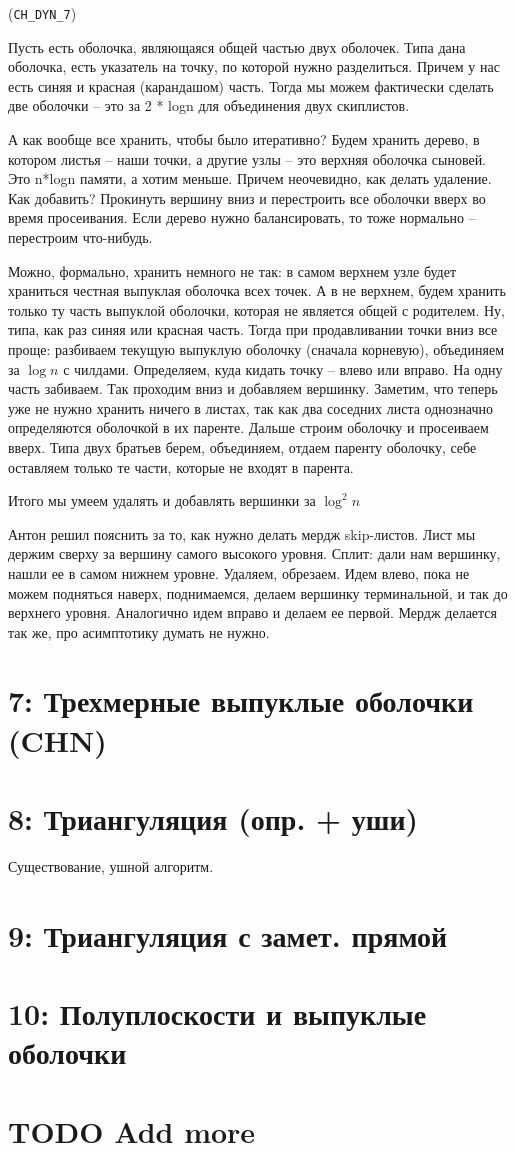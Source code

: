 \documentclass[11pt]{article}
\begin{document}
(\verb~CH_DYN_7~)

Пусть есть оболочка, являющаяся общей частью двух оболочек. Типа
дана оболочка, есть указатель на точку, по которой нужно
разделиться. Причем у нас есть синяя и красная (карандашом) часть.
Тогда мы можем фактически сделать две оболочки -- это за 2 * logn
для объединения двух скиплистов.

А как вообще все хранить, чтобы было итеративно? Будем хранить
дерево, в котором листья -- наши точки, а другие узлы -- это верхняя
оболочка сыновей. Это n*logn памяти, а хотим меньше. Причем
неочевидно, как делать удаление. Как добавить? Прокинуть вершину
вниз и перестроить все оболочки вверх во время просеивания. Если
дерево нужно балансировать, то тоже нормально -- перестроим
что-нибудь.

Можно, формально, хранить немного не так: в самом верхнем узле будет
храниться честная выпуклая оболочка всех точек. А в не верхнем,
будем хранить только ту часть выпуклой оболочки, которая не является
общей с родителем. Ну, типа, как раз синяя или красная часть. Тогда
при продавливании точки вниз все проще: разбиваем текущую выпуклую
оболочку (сначала корневую), объединяем за $\log{n}$ с
чилдами. Определяем, куда кидать точку -- влево или вправо. На одну
часть забиваем. Так проходим вниз и добавляем вершинку. Заметим, что
теперь уже не нужно хранить ничего в листах, так как два соседних
листа однозначно определяются оболочкой в их паренте. Дальше строим
оболочку и просеиваем вверх. Типа двух братьев берем, объединяем,
отдаем паренту оболочку, себе оставляем только те части, которые не
входят в парента.

Итого мы умеем удалять и добавлять вершинки за $\log^2{n}$


Антон решил пояснить за то, как нужно делать мердж skip-листов. Лист
мы держим сверху за вершину самого высокого уровня. Сплит: дали нам
вершинку, нашли ее в самом нижнем уровне. Удаляем, обрезаем. Идем
влево, пока не можем подняться наверх, поднимаемся, делаем вершинку
терминальной, и так до верхнего уровня. Аналогично идем вправо и
делаем ее первой. Мердж делается так же, про асимптотику думать не
нужно.
\section{{\bfseries{}} 7:  Трехмерные выпуклые оболочки (CHN)}
\label{sec-8}
\section{{\bfseries{}} 8:  Триангуляция (опр. + уши)}
\label{sec-9}
Существование, ушной алгоритм.
\section{{\bfseries{}} 9:  Триангуляция с замет. прямой}
\label{sec-10}
\section{{\bfseries{}} 10: Полуплоскости и выпуклые оболочки}
\label{sec-11}
\section{TODO Add more}
\label{sec-12}
\end{document}
